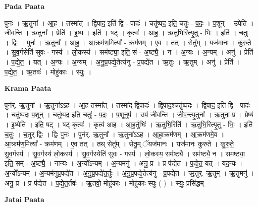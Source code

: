 \documentclass[17pt]{extarticle}
\begin{document}
\textbf{Pada Paata} \newline

पुनः॑ । ऋ॒तुना᳚ । आ॒ह॒ । तस्मा᳚त् । द्वि॒पाद॒ इति॑ द्वि - पादः॑ । चतु॑ष्पद॒ इति॒ चतुः॑ - प॒दः॒ । प॒शून् । उपेति॑ । जी॒व॒न्ति॒ । ऋ॒तुना᳚ । प्रेति॑ । इ॒ष्य॒ । इति॑ । षट् । कृत्वः॑ । आ॒ह॒ । ऋ॒तुभि॒रित्यृ॒तु - भिः॒ । इति॑ । च॒तुः । द्विः । पुनः॑ । ऋ॒तुना᳚ । आ॒ह॒ । आ॒क्रम॑ण॒मित्या᳚ - क्रम॑णम् । ए॒व । तत् । सेतु᳚म् । यज॑मानः । कु॒रु॒ते॒ । सु॒व॒र्गसेति॑ सुवः - गस्य॑ । लो॒कस्य॑ । सम॑ष्ट्या॒ इति॒ सं - अ॒ष्ट्यै॒ । न । अ॒न्यः । अ॒न्यम् । अनु॑ । प्रेति॑ । प॒द्ये॒त॒ । यत् । अ॒न्यः । अ॒न्यम् । अ॒नु॒प्र॒पद्ये॒तेत्य॑नु - प्र॒पद्ये॑त । ऋ॒तुः । ऋ॒तुम् । अनु॑ । प्रेति॑ । प॒द्ये॒त॒ । ऋ॒तवः॑ । मोहु॑काः । स्युः॒ ।  \newline


\textbf{Krama Paata} \newline

पुन॑र्. ऋ॒तुना᳚ । ऋ॒तुना॑ऽऽह । आ॒ह॒ तस्मा᳚त् । तस्मा᳚द् द्वि॒पादः॑ । द्वि॒पाद॒श्चतु॑ष्पदः । द्वि॒पाद॒ इति॑ द्वि - पादः॑ । चतु॑ष्पदः प॒शून् । चतु॑ष्पद॒ इति॒ चतुः॑ - प॒दः॒ । प॒शूनुप॑ । उप॑ जीवन्ति । जी॒व॒न्त्यृ॒तुना᳚ । ऋ॒तुना॒ प्र । प्रेष्य॑ । इ॒ष्येति॑ । इति॒ षट् । षट् कृत्वः॑ । कृत्व॑ आह । आ॒ह॒र्तुभिः॑ । ऋ॒तुभि॒रिति॑ । ऋ॒तुभि॒रित्यृ॒तु - भिः॒ । इति॑ च॒तुः । च॒तुर् द्विः । द्विः पुनः॑ । पुन॑र्. ऋ॒तुना᳚ । ऋ॒तुना॑ऽऽह । आ॒हा॒क्रम॑णम् । आ॒क्रम॑णमे॒व । आ॒क्रम॑ण॒मित्या᳚ - क्रम॑णम् । ए॒व तत् । तथ् सेतु᳚म् । सेतु॒म् ॅयज॑मानः । यज॑मानः कुरुते । कु॒रु॒ते॒ सु॒व॒र्गस्य॑ । सु॒व॒र्गस्य॑ लो॒कस्य॑ । सु॒व॒र्गस्येति॑ सुवः - गस्य॑ । लो॒कस्य॒ सम॑ष्ट्यै । सम॑ष्ट्यै॒ न । सम॑ष्ट्या॒ इति॒ सम् - अ॒ष्ट्यै॒ । नान्यः । अ॒न्यो᳚ऽन्यम् । अ॒न्यमनु॑ । अनु॒ प्र । प्र प॑द्येत । प॒द्ये॒त॒ यत् । यद॒न्यः । अ॒न्यो᳚ऽन्यम् । अ॒न्यम॑नुप्र॒पद्ये॑त । अ॒नु॒प्र॒पद्ये॑त॒र्तुः । अ॒नु॒प्र॒पद्ये॒तेत्य॑नु - प्र॒पद्ये॑त । ऋ॒तुर्. ऋ॒तुम् । ऋ॒तुमनु॑ । अनु॒ प्र । प्र प॑द्येत । प॒द्ये॒त॒र्तवः॑ । ऋ॒तवो॒ मोहु॑काः । मोहु॑काः स्युः ( ) । स्युः॒ प्रसि॑द्धम् \newline

\textbf{Jatai Paata} \newline
\end{document}
